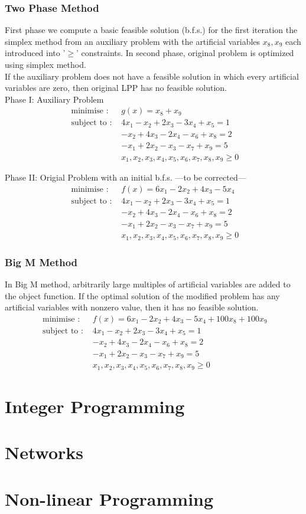 \subsubsection{Two Phase Method}
First phase we compute a basic feasible solution (b.f.s.) for the first iteration the simplex method from an auxiliary problem with the artificial variables $x_8,x_9$ each introduced into '$\ge$' constraints. In second phase, original problem is optimized using simplex method.\\

	If the auxiliary problem does not have a feasible solution in which every artificial variables are zero, then original LPP has no feasible solution.\\

Phase I: Auxiliary Problem
\begin{align*}
	\text{ minimise : } & g(x) = x_8 + x_9 \\
\text{ subject to : } & 4x_1 - x_2 + 2x_3 - 3x_4 + x_5 = 1 \\
& -x_2 + 4x_3 - 2x_4 - x_6 + x_8 = 2 \\
& -x_1 + 2x_2 - x_3 - x_7 + x_9 = 5 \\
& x_1,x_2,x_3,x_4,x_5,x_6,x_7,x_8,x_9 \ge  0
\end{align*}

Phase II: Origial Problem with an initial b.f.s. 
---to be corrected---
\begin{align*}
	\text{ minimise : } & f(x) = 6x_1 - 2x_2 +4x_3 - 5x_4 \\
\text{ subject to : } & 4x_1 - x_2 + 2x_3 - 3x_4 + x_5 = 1 \\
& -x_2 + 4x_3 - 2x_4 - x_6 + x_8 = 2 \\
& -x_1 + 2x_2 - x_3 - x_7 + x_9 = 5 \\
& x_1,x_2,x_3,x_4,x_5,x_6,x_7,x_8,x_9 \ge  0
\end{align*}

\subsubsection{Big M Method}
In Big M method, arbitrarily large multiples of artificial variables are added to the object function. If the optimal solution of the modified problem has any artificial variables with nonzero value, then it has no feasible solution.
\begin{align*}
	\text{ minimise : } & f(x) = 6x_1 - 2x_2 +4x_3 - 5x_4 + 100x_8 + 100x_9 \\
\text{ subject to : } & 4x_1 - x_2 + 2x_3 - 3x_4 + x_5 = 1 \\
& -x_2 + 4x_3 - 2x_4 - x_6 + x_8 = 2 \\
& -x_1 + 2x_2 - x_3 - x_7 + x_9 = 5 \\
& x_1,x_2,x_3,x_4,x_5,x_6,x_7,x_8,x_9 \ge  0
\end{align*}

\section{Integer Programming}
\section{Networks}
\section{Non-linear Programming}


